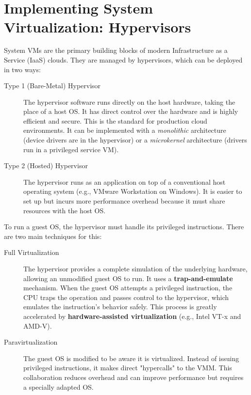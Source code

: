 \section{Implementing System Virtualization: Hypervisors}

System VMs are the primary building blocks of modern Infrastructure as a Service (IaaS) clouds. They are managed by hypervisors, which can be deployed in two ways:

\begin{description}
    \item[Type 1 (Bare-Metal) Hypervisor] The hypervisor software runs directly on the host hardware, taking the place of a host OS. It has direct control over the hardware and is highly efficient and secure. This is the standard for production cloud environments. It can be implemented with a \textit{monolithic} architecture (device drivers are in the hypervisor) or a \textit{microkernel} architecture (drivers run in a privileged service VM).
    \item[Type 2 (Hosted) Hypervisor] The hypervisor runs as an application on top of a conventional host operating system (e.g., VMware Workstation on Windows). It is easier to set up but incurs more performance overhead because it must share resources with the host OS.
\end{description}


To run a guest OS, the hypervisor must handle its privileged instructions. There are two main techniques for this:
\begin{description}
    \item[Full Virtualization] The hypervisor provides a complete simulation of the underlying hardware, allowing an unmodified guest OS to run. It uses a \textbf{trap-and-emulate} mechanism. When the guest OS attempts a privileged instruction, the CPU traps the operation and passes control to the hypervisor, which emulates the instruction's behavior safely. This process is greatly accelerated by \textbf{hardware-assisted virtualization} (e.g., Intel VT-x and AMD-V).
    \item[Paravirtualization] The guest OS is modified to be aware it is virtualized. Instead of issuing privileged instructions, it makes direct "hypercalls" to the VMM. This collaboration reduces overhead and can improve performance but requires a specially adapted OS.
\end{description}

